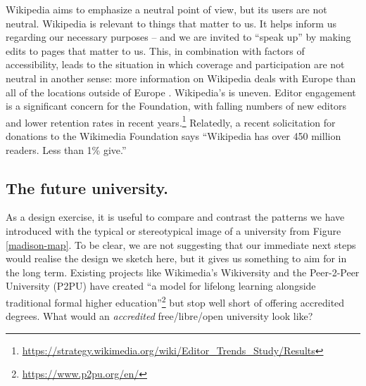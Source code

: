 Wikipedia aims to emphasize a neutral point of view, but its users are
not neutral.  Wikipedia is relevant to things that matter to us.  It
helps inform us regarding our necessary purposes -- and we are invited
to ``speak up'' by making edits to pages that matter to us.  This, in
combination with factors of accessibility, leads to the situation in
which coverage and participation are not neutral in another sense:
more information on Wikipedia deals with Europe than all of the
locations outside of Europe \cite{graham2014uneven}.  Wikipedia's
 is uneven.  Editor engagement is a
significant concern for the Foundation, with falling numbers of new
editors and lower retention rates in recent
years.\footnote{\url{https://strategy.wikimedia.org/wiki/Editor_Trends_Study/Results}}
Relatedly, a recent solicitation for donations to the Wikimedia
Foundation says ``Wikipedia has over 450 million readers.  Less than
1\% give.''

\subsection{The future university.}
As a design exercise, it is useful to compare and contrast the
patterns we have introduced with the typical or stereotypical image of
a university from Figure \ref{madison-map}.  To be clear, we are not
suggesting that our immediate next steps would realise the design we
sketch here, but it gives us something to aim for in the long term.
%
Existing projects like Wikimedia's Wikiversity and the Peer-2-Peer
University (P2PU) have created ``a model for lifelong learning
alongside traditional formal higher
education''\footnote{\url{https://www.p2pu.org/en/}} but stop well
short of offering accredited degrees.  What would an \emph{accredited}
free/libre/open university look like?

